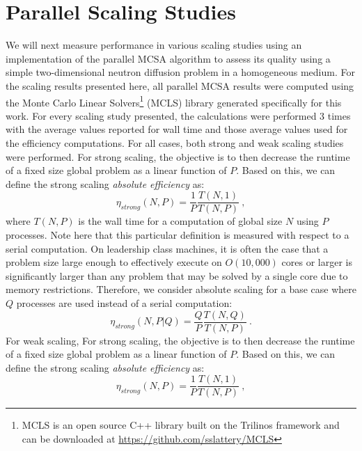 \documentclass{snamc2013}
\begin{document}
\section{Parallel Scaling Studies}
We will next measure performance in various scaling studies using an
implementation of the parallel MCSA algorithm to assess its quality
using a simple two-dimensional neutron diffusion problem in a
homogeneous medium. For the scaling results presented here, all
parallel MCSA results were computed using the Monte Carlo Linear
Solvers\footnote{MCLS is an open source C++ library built on the
  Trilinos\cite{heroux_overview_2005} framework and can be downloaded
  at \url{https://github.com/sslattery/MCLS}} (MCLS) library generated
specifically for this work. For every scaling study presented, the
calculations were performed 3 times with the average values reported
for wall time and those average values used for the efficiency
computations. For all cases, both strong and weak scaling studies were
performed. For strong scaling, the objective is to then decrease the
runtime of a fixed size global problem as a linear function of
$P$. Based on this, we can define the strong scaling \textit{absolute
  efficiency} as:
\begin{equation}
  \eta_{strong}(N,P) = \frac{1}{P} \frac{T(N,1)}{T(N,P)}\:,
  \label{eq:strong_scaling_absolute}
\end{equation}
where $T(N,P)$ is the wall time for a computation of global size $N$
using $P$ processes. Note here that this particular definition is
measured with respect to a serial computation. On leadership class
machines, it is often the case that a problem size large enough to
effectively execute on $O(10,000)$ cores or larger is significantly
larger than any problem that may be solved by a single core due to
memory restrictions. Therefore, we consider absolute scaling for a
base case where $Q$ processes are used instead of a serial
computation:
\begin{equation}
  \eta_{strong}(N,P|Q) = \frac{Q}{P} \frac{T(N,Q)}{T(N,P)}\:.
  \label{eq:strong_scaling_absolute_ref}
\end{equation}
For weak scaling, For strong scaling, the objective is to then decrease the runtime of a
fixed size global problem as a linear function of $P$. Based on this,
we can define the strong scaling \textit{absolute efficiency} as:
\begin{equation}
  \eta_{strong}(N,P) = \frac{1}{P} \frac{T(N,1)}{T(N,P)}\:,
  \label{eq:strong_scaling_absolute}
\end{equation}
\end{document}
